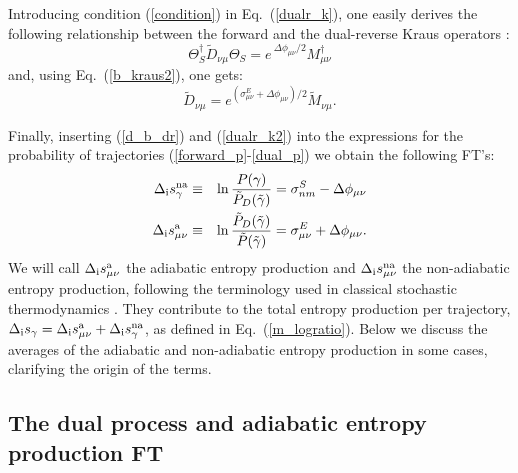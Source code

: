 \documentclass[aps,prx,twocolumn,showpacs,floatfix,superscriptaddress,graphics,longbibliography]{revtex4-1}
\newcommand{\HAT}{}
\begin{document}
Introducing condition (\ref{condition}) in Eq.~(\ref{dualr_k}), one easily derives  the following relationship between the forward and the dual-reverse Kraus operators \cite{MHP}:
\begin{equation}\label{d_b_dr}
\HAT \Theta_S^\dagger \HAT{\tilde{D}}_{\nu \mu} \HAT\Theta_S = e^{~\Delta \phi_{\mu \nu} /2}  \HAT{M}_{\mu \nu}^\dagger 
\end{equation}
and, using Eq.~(\ref{b_kraus2}), one gets:
 \begin{equation}
\label{dualr_k2}
 \HAT{\tilde{D}}_{\nu \mu}= e^{(\sigma^E_{\mu\nu}+\Delta \phi_{\mu \nu})/2}  \HAT{\tilde M}_{\nu \mu}.
\end{equation}

Finally, inserting  (\ref{d_b_dr}) and (\ref{dualr_k2}) into the expressions for the probability of trajectories (\ref{forward_p}-\ref{dual_p}) we obtain the following FT's:
\begin{eqnarray}\label{dualr_dft}
 \Delta_{\rm i} s^{\rm na}_\gamma &\equiv  & \ln \frac{P(\gamma)}{\tilde{P}_D (\tilde{\gamma})} = \sigma^S_{n m} - \Delta \phi_{\mu \nu}  \\ \label{dual_dft}
 \Delta_{\rm i} s^{\rm a}_{\mu \nu} &\equiv  & \ln \frac{\tilde{P}_D (\tilde{\gamma})}{\tilde P (\tilde\gamma)} = \sigma^E_{\mu \nu} + \Delta \phi_{\mu \nu}.
 \end{eqnarray}
We will call  $\Delta_{\rm i} s^{\rm a}_{\mu \nu}$ the adiabatic entropy production and $\Delta_{\rm i} s^{\rm na}_{\mu \nu}$  the non-adiabatic entropy production, 
following the terminology used in classical stochastic thermodynamics \cite{EspositoFaces,EspositoFacesI,EspositoFacesII}. 
They contribute to the total entropy production per trajectory,
$ \Delta_{\rm i} s_{\gamma}=\Delta_{\rm i} s^{\rm a}_{\mu \nu} + \Delta_{\rm i} s^{\rm na}_\gamma$, as defined in Eq.~(\ref{m_logratio}). 
Below we  discuss the averages of the adiabatic and non-adiabatic entropy production in some cases, clarifying the origin of the terms.

\subsection{The dual process and adiabatic entropy production FT}\label{sec:4b}
\end{document}
